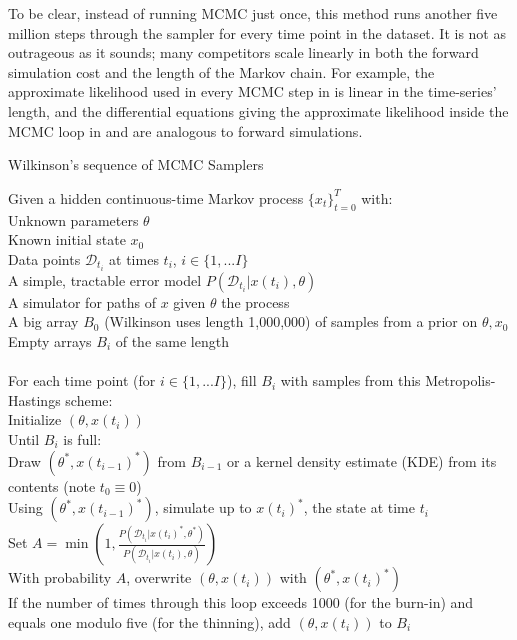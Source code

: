 \documentclass{article}
\begin{document}
To be clear, instead of running MCMC just once, this method runs another five million steps through the sampler for every time point in the dataset. It is not as outrageous as it sounds; many competitors scale linearly in both the forward simulation cost and the length of the Markov chain. %
For example, the approximate likelihood used in every MCMC step in \cite{golightly2011bayesian} is linear in the time-series' length, and the differential equations giving the approximate likelihood inside the MCMC loop in \cite{milner2013moment} and \cite{zechner2012moment} are analogous to forward simulations.

\begin{algorithm}[h]
\caption{ \label{pMCMC} Wilkinson's sequence of MCMC Samplers}
Given a hidden continuous-time Markov process $\{x_t\}_{t=0}^T$ with: \\
\Indp \Indp
Unknown parameters $\theta$\\
Known initial state $x_0$\\
Data points $\mathcal{D}_{t_{i}}$ at times $t_{i}$, $i \in \{1, ... I\}$ \\
A simple, tractable error model $P(\mathcal{D}_{t_{i}}|x(t_{i}), \theta)$\\
A simulator for paths of $x$ given $\theta$ the process\\
A big array $B_0$ (Wilkinson uses length 1,000,000) of samples from a prior on $\theta, x_0$\\
Empty arrays $B_{i}$ of the same length\\
$\phantom{0}$\\
\Indm \Indm
For each time point (for $i \in \{1, ... I\}$), fill $B_{i}$ with samples from this Metropolis-Hastings scheme:\\
\Indp\Indp
Initialize $(\theta, x(t_{i}))$ \\
Until $B_{i}$ is full: \\
\Indp\Indp
Draw $(\theta^*, x(t_{i-1})^*)$ from $B_{i-1}$ or a kernel density estimate (KDE) from its contents (note $t_0\equiv0$)\\
Using $(\theta^*, x(t_{i-1})^*)$, simulate up to $x(t_{i})^*$, the state at time $t_{i}$ \\
Set $A=\min(1, \frac{P(\mathcal{D}_{t_{i}}|x(t_{i})^*, \theta^*)}{P(\mathcal{D}_{t_{i}}|x(t_{i}), \theta)})$\\
With probability $A$, overwrite $(\theta, x(t_{i}))$ with $(\theta^*, x(t_{i})^*)$\\
If the number of times through this loop exceeds 1000 (for the burn-in) and equals one modulo five (for the thinning), add $(\theta, x(t_{i}))$ to $B_{i}$\\
\Indm \Indm
\end{algorithm}
\end{document}
